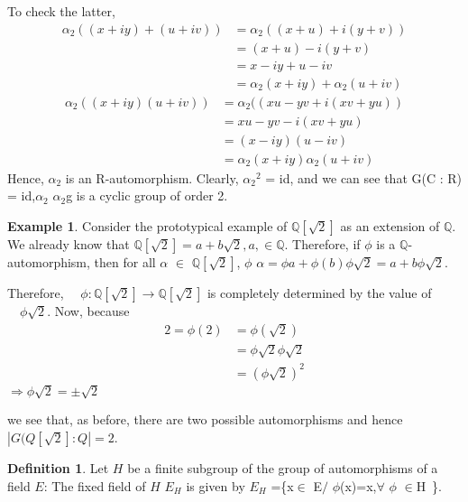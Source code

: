 \documentclass[12pt]{article}
\theoremstyle{definition}
\newtheorem{defn}[thm]{Definition}
\newtheorem{exmp}[thm]{Example}
\theoremstyle{remark}
\begin{document}
To check the latter,
\begin{align*}
   \alpha_{2}((x+iy)+(u+iv))&=\alpha_{2}((x+u)+i(y+v))\\
                               &=(x+u)-i(y+v)\\
                               &=x-iy + u-iv\\
                               &=\alpha_{2}(x+iy)+\alpha_{2}(u+iv)
\end{align*}
\begin{align*}
\alpha_{2}((x+iy)(u+iv))&=\alpha_{2}((xu-yv+i(xv+yu))\\
                               &=xu-yv-i(xv+yu)\\
                               &=(x-iy)(u-iv)\\
                               &=\alpha_{2}(x+iy)\alpha_{2}(u+iv)
 \end{align*}
Hence, $\alpha_{2}$ is an R-automorphism. Clearly, $\alpha_{2}$$^{2}$
 = id, and we can see that G(C : R) = {id,$\alpha_{2}$} $\alpha_{2}$g is a cyclic group of order 2.

\begin{exmp}
Consider the prototypical example of $\mathbb{Q}[\sqrt{2}]$ as an extension of $\mathbb{Q}$. We already know that
$\mathbb{Q}[\sqrt{2}] = {a + b\sqrt{2}, a,\in \mathbb{Q}}$.
Therefore, if $\phi $ is a $\mathbb{Q}$-automorphism, then for all $\alpha$ ${\in}$ $\mathbb{Q}[\sqrt{2}]$, $\phi$ $\alpha = \phi a + \phi (b)\phi \sqrt{2} = a + b\phi \sqrt{2}$.

Therefore, $\quad \phi  : \mathbb{Q}[\sqrt{2}] \rightarrow \mathbb{Q}[\sqrt{2}]$ is completely determined by the value of $\quad \phi \sqrt {2}$. Now, because
\begin{align*}
          2=\phi(2)&=\phi(\sqrt{2})\\
                   &=\phi \sqrt{2} \phi \sqrt{2}\\
                   &=(\phi \sqrt{2})^{2}
\end{align*}
$\Rightarrow \phi \sqrt{2}=\pm \sqrt {2}$
 \end{exmp}

we see that, as before, there are two possible automorphisms and hence  $| G(Q[ \sqrt {2}]:Q | =2$.

\begin{defn}
Let $H$ be a finite subgroup of the group of automorphisms of a field $E$: The fixed field of $H$ $E_{H}$ is given by $E_{H}$ =\{x$\in$ E$/$ $ \phi$(x)=x,$\forall$ $\phi$ $\in$H\ \}.
\end{defn}
\end{document}
